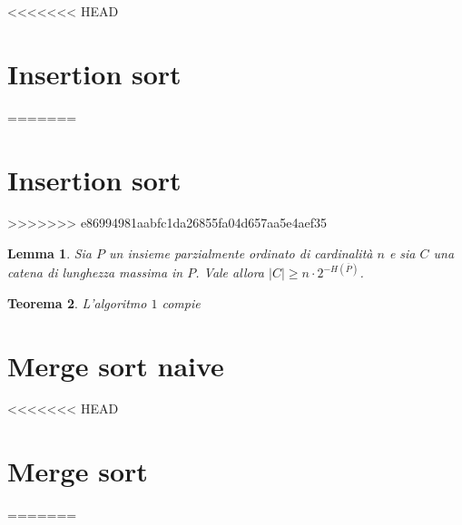 \documentclass[12pt]{article}
\newtheorem{theorem}{Teorema}[section]
\newtheorem{lemma}[theorem]{Lemma}
\begin{document}
<<<<<<< HEAD
\section{Insertion sort}
=======
\section{Insertion sort} 
>>>>>>> e86994981aabfc1da26855fa04d657aa5e4aef35
\begin{lemma}
	Sia \(P\) un insieme parzialmente ordinato di cardinalità \(n\) e sia \(C\) una catena di lunghezza massima in \(P\). Vale allora \(\left|C\right|\ge n\cdot2^{-H(\overline{P})}\). 
\end{lemma}
\begin{theorem}
	L'algoritmo \(1\) compie 
\end{theorem}

\section{Merge sort naive}

<<<<<<< HEAD
\section{Merge sort}
=======
\end{document}

